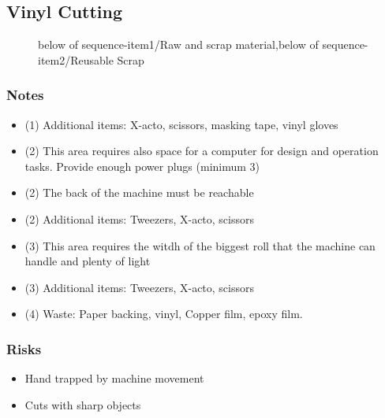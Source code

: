 \documentclass[a4paper,12pt,titlepage]{article}
\begin{document}
\subsection{Vinyl Cutting}
\begin{figure}[h]

\centering
{}
{below of sequence-item1/{Raw and scrap material},below of sequence-item2/Reusable Scrap}
\vspace{1cm}
\end{figure}
\subsubsection*{Notes}
\begin{itemize}
\item (1) Additional items: X-acto, scissors, masking tape, vinyl gloves
\item (2) This area requires also space for a computer for design and operation tasks. Provide enough power plugs (minimum 3)
\item (2) The back of the machine must be reachable
\item (2) Additional items: Tweezers, X-acto, scissors
\item (3) This area requires the witdh of the biggest roll that the machine can handle and plenty of light
\item (3) Additional items: Tweezers, X-acto, scissors
\item (4) Waste: Paper backing, vinyl, Copper film, epoxy film.
\end{itemize}
\subsubsection*{Risks}
\begin{itemize}
\item Hand trapped by machine movement
\item Cuts with sharp objects
\end{itemize}
\end{document}
